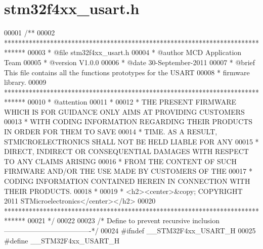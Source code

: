 \section{stm32f4xx\+\_\+usart.\+h}
\label{stm32f4xx__usart_8h_source}

\begin{DoxyCode}
00001 \textcolor{comment}{/**}
00002 \textcolor{comment}{  ******************************************************************************}
00003 \textcolor{comment}{  * @file    stm32f4xx\_usart.h}
00004 \textcolor{comment}{  * @author  MCD Application Team}
00005 \textcolor{comment}{  * @version V1.0.0}
00006 \textcolor{comment}{  * @date    30-September-2011}
00007 \textcolor{comment}{  * @brief   This file contains all the functions prototypes for the USART }
00008 \textcolor{comment}{  *          firmware library.}
00009 \textcolor{comment}{  ******************************************************************************}
00010 \textcolor{comment}{  * @attention}
00011 \textcolor{comment}{  *}
00012 \textcolor{comment}{  * THE PRESENT FIRMWARE WHICH IS FOR GUIDANCE ONLY AIMS AT PROVIDING CUSTOMERS}
00013 \textcolor{comment}{  * WITH CODING INFORMATION REGARDING THEIR PRODUCTS IN ORDER FOR THEM TO SAVE}
00014 \textcolor{comment}{  * TIME. AS A RESULT, STMICROELECTRONICS SHALL NOT BE HELD LIABLE FOR ANY}
00015 \textcolor{comment}{  * DIRECT, INDIRECT OR CONSEQUENTIAL DAMAGES WITH RESPECT TO ANY CLAIMS ARISING}
00016 \textcolor{comment}{  * FROM THE CONTENT OF SUCH FIRMWARE AND/OR THE USE MADE BY CUSTOMERS OF THE}
00017 \textcolor{comment}{  * CODING INFORMATION CONTAINED HEREIN IN CONNECTION WITH THEIR PRODUCTS.}
00018 \textcolor{comment}{  *}
00019 \textcolor{comment}{  * <h2><center>&copy; COPYRIGHT 2011 STMicroelectronics</center></h2>}
00020 \textcolor{comment}{  ******************************************************************************  }
00021 \textcolor{comment}{  */}
00022 
00023 \textcolor{comment}{/* Define to prevent recursive inclusion -------------------------------------*/}
00024 \textcolor{preprocessor}{#}\textcolor{preprocessor}{ifndef} \textcolor{preprocessor}{\_\_STM32F4xx\_USART\_H}
00025 \textcolor{preprocessor}{#}\textcolor{preprocessor}{define} \textcolor{preprocessor}{\_\_STM32F4xx\_USART\_H}

\end{DoxyCode}
